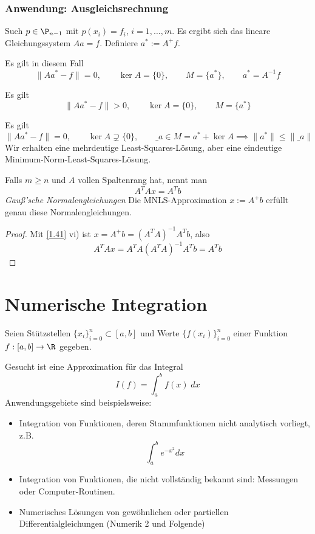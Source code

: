 \documentclass[11pt]{scrbook}
\begin{document}
\subsection{Anwendung: Ausgleichsrechnung}

Such $p\in \P_{n-1}$ mit $p(x_i)=f_i$, $i=1,\dotsc,m$.
Es ergibt sich das lineare Gleichungssystem $Aa = f$.
Definiere $a^* := A^+f$.

\begin{seg}[$m=n$ (Polynominterpolation)]
	Es gilt in diesem Fall
	\[
		\|Aa^*-f\| = 0, \qquad \ker A = \{0\}, \qquad M = \{a^*\}, \qquad a^* = A^{-1}f
	\]
\end{seg}
\begin{seg}[$m>n$]
	Es gilt
	\[
		\|Aa^*-f\| > 0, \qquad \ker A = \{0\}, \qquad M = \{a^*\}
	\]
\end{seg}
\begin{seg}[$m<n$]
	Es gilt
	\[
		\|Aa^*-f\| = 0, \qquad \ker A \supsetneq \{0\}, \qquad \_a \in M = a^* + \ker A \implies \|a^*\| \le \|\_a\|
	\]
	Wir erhalten eine mehrdeutige Least-Squares-Lösung, aber eine eindeutige Minimum-Norm-Least-Squares-Lösung.
\end{seg}
\begin{nt*}
	Falls $m\ge n$ und $A$ vollen Spaltenrang hat, nennt man
	\[
		A^TAx = A^Tb
	\]
	\emph{Gauß'sche Normalengleichungen}
	Die MNLS-Approximation $x:=A^+b$ erfüllt genau diese Normalengleichungen.
	\begin{proof}
		Mit \ref{1.41} vi) ist $x=A^+b = (A^TA)^{-1}A^Tb$, also
		\[
			A^TAx = A^TA(A^TA)^{-1}A^T b = A^Tb
		\]
	\end{proof}
\end{nt*}



\chapter{Numerische Integration}	



Seien Stützstellen $\{x_i\}_{i=0}^n \subset [a,b]$ und Werte $\{f(x_i)\}_{i=0}^n$ einer Funktion $f:[a,b]\to \R$ gegeben.

Gesucht ist eine Approximation für das Integral
\[
	I(f) = \int_a^b f(x) \;dx
\]
Anwendungsgebiete sind beispielsweise:
\begin{itemize}
	\item
		Integration von Funktionen, deren Stammfunktionen nicht analytisch vorliegt, z.B.
		\[
			\int_a^b e^{-x^2} dx
		\]
	\item
		Integration von Funktionen, die nicht vollständig bekannt sind: Messungen oder Computer-Routinen.
	\item
		Numerisches Lösungen von gewöhnlichen oder partiellen Differentialgleichungen (Numerik 2 und Folgende)
\end{itemize}
\end{document}
